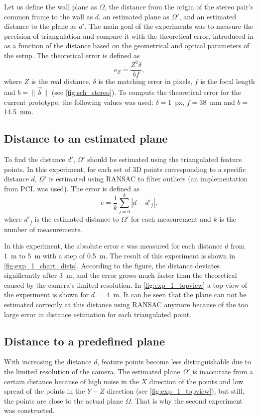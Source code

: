 Let us define the wall plane as $\Omega$, the distance from the origin of the stereo pair's common frame to the wall as $d$, an estimated plane as $\Omega'$, and an estimated distance to the plane as $d'$.
The main goal of the experiments was to measure the precision of triangulation and compare it with the theoretical error, introduced in \cite{cv_theoretical_error} as a function of the distance based on the geometrical and optical parameters of the setup.
The theoretical error is defined as
\begin{equation}
    e_Z = \frac{Z^2 \delta}{bf},
\end{equation}
where $Z$ is the real distance, $\delta$ is the matching error in pixels, $f$ is the focal length and $b = \lVert \vec{b} \rVert$ (see \autoref{fig:sch_stereo}).
To compute the theoretical error for the current prototype, the following values was used: $\delta=$\SI{1}{px}, $f=$\SI{38}{\milli\meter} and $b=$\SI{14.5}{\milli\meter}.

\subsection{Distance to an estimated plane}
\label{sec:exp1}
To find the distance $d'$, $\Omega'$ should be estimated using the triangulated feature points.
In this experiment, for each set of 3D points corresponding to a specific distance $d$, $\Omega'$ is estimated using RANSAC to filter outliers (an implementation from PCL was used).
The error is defined as
\begin{equation}
    e = \frac{1}{k}\sum_{j=0}^{k}{|d - d'_j|},
\end{equation}
where $d'_j$ is the estimated distance to $\Omega'$ for each measurement and $k$ is the number of measurements.

In this experiment, the absolute error $e$ was measured for each distance $d$ from \SI{1}{\meter} to \SI{5}{\meter} with a step of \SI{0.5}{\meter}.
The result of this experiment is shown in \autoref{fig:exp_1_chart_dists}.
According to the figure, the distance deviates significantly after \SI{3}{\meter}, and the error grows much faster than the theoretical caused by the camera's limited resolution.
In \autoref{fig:exp_1_topview} a top view of the experiment is shown for $d=$ \SI{4}{\meter}.
It can be seen that the plane can not be estimated correctly at this distance using RANSAC anymore because of the too large error in distance estimation for each triangulated point.

\subsection{Distance to a predefined plane}
\label{sec:exp2}
With increasing the distance $d$, feature points become less distinguishable due to the limited resolution of the camera.
The estimated plane $\Omega'$ is inaccurate from a certain distance because of high noise in the $X$ direction of the points and low spread of the points in the $Y-Z$ direction (see \autoref{fig:exp_1_topview}), but still, the points are close to the actual plane $\Omega$.
That is why the second experiment was constructed.

